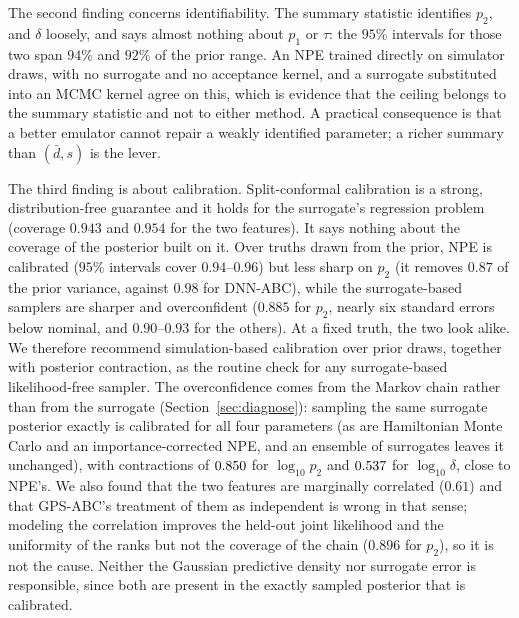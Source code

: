 \documentclass[sn-basic,iicol,pdflatex]{sn-jnl}
\begin{document}
The second finding concerns identifiability. The summary statistic identifies
$p_2$, and $\delta$ loosely, and says almost nothing about $p_1$ or $\tau$: the $95\%$ intervals
for those two span $94\%$ and $92\%$ of the prior range. An NPE trained directly on simulator draws, with no
surrogate and no acceptance kernel, and a surrogate substituted into an MCMC kernel agree on this, which is evidence that the
ceiling belongs to the summary statistic and not to either method. A practical consequence is that a better emulator cannot
repair a weakly identified parameter; a richer summary than $(\bar d,s)$ is the lever.

The third finding is about calibration. Split-conformal calibration is a strong, distribution-free guarantee and it holds
for the surrogate's regression problem (coverage $0.943$ and $0.954$ for the two features). It says nothing about the
coverage of the posterior built on it. Over truths drawn from the prior, NPE is calibrated ($95\%$ intervals cover $0.94$--$0.96$) but
less sharp on $p_2$ (it removes $0.87$ of the prior variance, against $0.98$ for DNN-ABC), while the surrogate-based
samplers are sharper and overconfident ($0.885$ for $p_2$, nearly six standard errors below nominal, and $0.90$--$0.93$ for
the others). At a fixed truth, the two look alike. We therefore recommend simulation-based calibration over prior draws, together with posterior
contraction, as the routine check for any surrogate-based likelihood-free sampler. The overconfidence comes from the Markov chain rather than from the surrogate (Section~\ref{sec:diagnose}): sampling the same surrogate posterior exactly is calibrated for all four parameters (as are Hamiltonian Monte Carlo and an importance-corrected NPE, and an ensemble of surrogates leaves it unchanged), with contractions
of $0.850$ for $\log_{10}p_2$ and $0.537$ for $\log_{10}\delta$, close to NPE's. We also found that the two features are marginally correlated ($0.61$) and that GPS-ABC's treatment of them as independent is wrong
in that sense; modeling the correlation improves the held-out joint likelihood and the uniformity of the ranks but not the coverage of the chain ($0.896$ for $p_2$), so it is not the cause. Neither the Gaussian predictive density nor surrogate error is
responsible, since both are present in the exactly sampled posterior that is calibrated.
\end{document}
